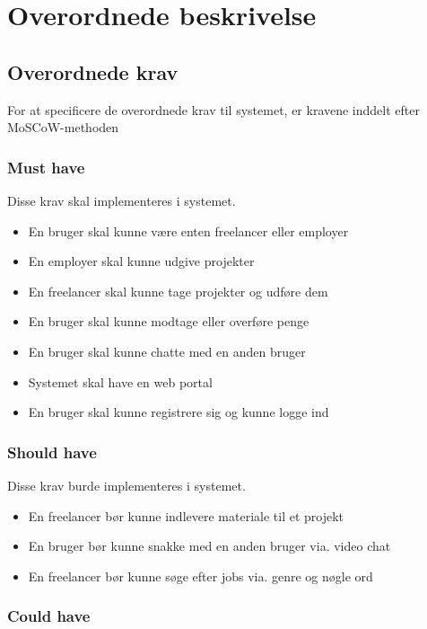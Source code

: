 \chapter{Overordnede beskrivelse}

\section{Overordnede krav}

For at specificere de overordnede krav til systemet, er kravene inddelt efter MoSCoW-methoden %

\subsection{Must have}

Disse krav skal implementeres i systemet.

\begin{itemize}
    \item En bruger skal kunne være enten freelancer eller employer
    \item En employer skal kunne udgive projekter
    \item En freelancer skal kunne tage projekter og udføre dem
    \item En bruger skal kunne modtage eller overføre penge
    \item En bruger skal kunne chatte med en anden bruger
    \item Systemet skal have en web portal
    \item En bruger skal kunne registrere sig og kunne logge ind
\end{itemize}

\subsection{Should have}

Disse krav burde implementeres i systemet.

\begin{itemize}
    \item En freelancer bør kunne indlevere materiale til et projekt
    \item En bruger bør kunne snakke med en anden bruger via. video chat
    \item En freelancer bør kunne søge efter jobs via. genre og nøgle ord
\end{itemize}

\subsection{Could have}

